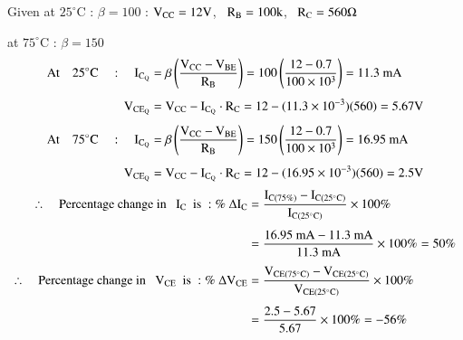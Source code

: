 \begin{solution}
Given at $25^{\circ}$C : $\beta=100$ : $\textrm{V}_{\text{CC}}=12\textrm{V}$, \ $\textrm{R}_{\textrm{B}}=100\textrm{k}$, \ $\textrm{R}_{\textrm{C}}=560\Omega$

at $75^{\circ}$C : $\beta=150$
\begin{align*}
\text{At}\quad 25^{\circ}\textrm{C}\quad : \quad \textrm{I}_{\textrm{C}_{\textrm{Q}}} &= \beta\left(\frac{\textrm{V}_{\text{CC}}-\textrm{V}_{\text{BE}}}{\textrm{R}_{\textrm{B}}}\right)=100\left(\frac{12-0.7}{100\times 10^{3}}\right)=11.3\text{~mA}\\[4pt]
\textrm{V}_{\text{CE}_{\textrm{Q}}} &= \textrm{V}_{\text{CC}}-\textrm{I}_{\textrm{C}_{\textrm{Q}}}\cdot \textrm{R}_{\textrm{C}}=12-(11.3\times 10^{-3})(560)=5.67\textrm{V}\\[4pt]
\text{At}\quad 75^{\circ}\textrm{C}\quad :\quad \textrm{I}_{\textrm{C}_{\textrm{Q}}} &= \beta \left(\frac{\textrm{V}_{\text{CC}}-\textrm{V}_{\text{BE}}}{\textrm{R}_{\textrm{B}}}\right)=150\left(\frac{12-0.7}{100\times 10^{3}}\right)=16.95\text{~mA}\\[4pt]
\textrm{V}_{\text{CE}_{\textrm{Q}}} &= \textrm{V}_{\text{CC}}-\textrm{I}_{\textrm{C}_{\textrm{Q}}}\cdot \textrm{R}_{\textrm{C}} = 12-(16.95\times 10^{-3})(560)=2.5\textrm{V}
\end{align*}
\begin{align*}
\therefore\quad \text{Percentage change in~~ $\textrm{I}_{\textrm{C}}$~ is } : \%\ \Delta \textrm{I}_{\textrm{C}} &= \frac{\textrm{I}_{\textrm{C}(75\%)}-\textrm{I}_{\textrm{C}(25^{\circ}\textrm{C})}}{\textrm{I}_{\textrm{C}(25^{\circ}\textrm{C})}}\times 100\%\\[4pt]
&= \frac{16.95\text{~mA}-11.3\text{~mA}}{11.3\text{~mA}}\times 100\%= 50\%\\[4pt]
\therefore\quad \text{Percentage change in~~ $\textrm{V}_{\text{CE}}$~ is } : \%\ \Delta \textrm{V}_{\text{CE}} &= \frac{\textrm{V}_{\text{CE}(75^{\circ}\textrm{C})}-\textrm{V}_{\text{CE}(25^{\circ}\textrm{C})}}{\textrm{V}_{\text{CE}(25^{\circ}\textrm{C})}}\times 100\%\\[4pt]
&= \frac{2.5-5.67}{5.67}\times 100\% = -56\%
\end{align*}
\end{solution}

